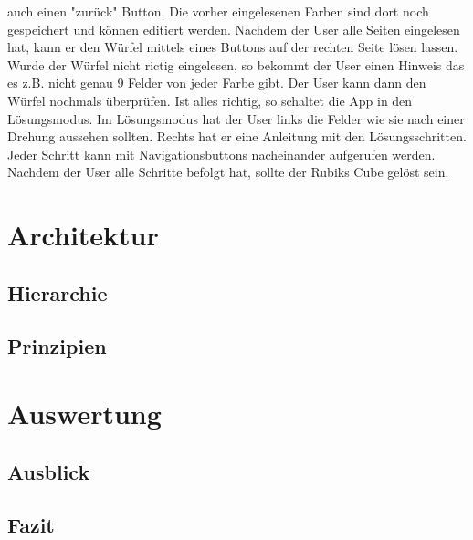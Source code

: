auch einen "zurück" Button. Die vorher eingelesenen Farben sind dort noch gespeichert und können editiert werden.
Nachdem der User alle Seiten eingelesen hat, kann er den Würfel mittels eines Buttons auf der rechten Seite lösen
lassen. Wurde der Würfel nicht rictig eingelesen, so bekommt der User einen Hinweis das es z.B. nicht genau 9
Felder von jeder Farbe gibt. Der User kann dann den Würfel nochmals überprüfen. Ist alles richtig, so schaltet
die App in den Lösungsmodus. Im Lösungsmodus hat der User links die Felder wie sie nach einer Drehung aussehen
sollten. Rechts hat er eine Anleitung mit den Lösungsschritten. Jeder Schritt kann mit Navigationsbuttons
nacheinander aufgerufen werden. Nachdem der User alle Schritte befolgt hat, sollte der Rubiks Cube gelöst sein.

\section{Architektur}  %
\subsection{Hierarchie}  %
\subsection{Prinzipien}  %

\section{Auswertung}  %
\subsection{Ausblick}  %
\subsection{Fazit}  %


\appendix
\printbibliography[heading=bibintoc,title={Quellenverzeichnis}]
\listoffigures


